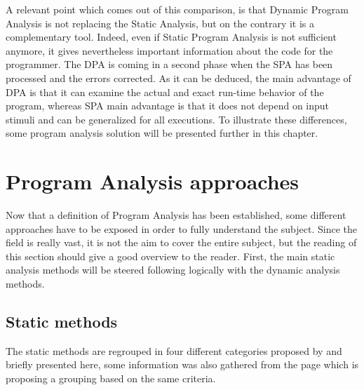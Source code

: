 \bigskip

A relevant point which comes out of this comparison, is that Dynamic Program Analysis is not replacing the Static Analysis, but on the contrary it is a complementary tool. Indeed, even if Static Program Analysis is not sufficient anymore, it gives nevertheless important information about the code for the programmer. The DPA is coming in a second phase when the SPA has been processed and the errors corrected. As it can be deduced, the main advantage of DPA is that it can examine the actual and exact run-time behavior of the program, whereas SPA main advantage is that it does not depend on input stimuli and can be generalized for all executions. To illustrate these differences, some program analysis solution will be presented further in this chapter.

\pagebreak

\section{Program Analysis approaches}
Now that a definition of Program Analysis has been established, some different approaches have to be exposed in order to fully understand the subject. Since the field is really vast, it is not the aim to cover the entire subject, but the reading of this section should give a good overview to the reader. First, the main static analysis methods will be steered following logically with the dynamic analysis methods.

\subsection{Static methods}

The static methods are regrouped in four different categories proposed by \cite{Nielson2004} and briefly presented here, some information was also gathered from the \cite{Wikipedi2016} page which is proposing a grouping based on the same criteria.

